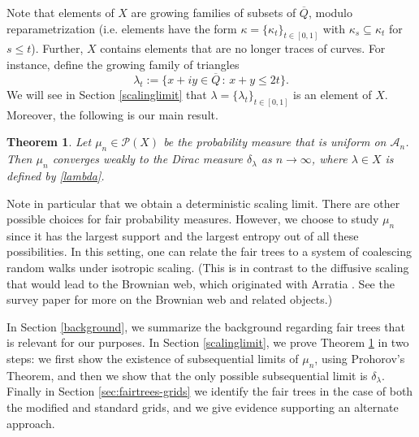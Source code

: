 \documentclass[preprint,12pt]{elsarticle}
\newtheorem{theorem}{Theorem}[section]
\theoremstyle{definition}
\theoremstyle{remark}
\numberwithin{equation}{section}
\newcommand{\cP}{\mathcal{P}}
\begin{document}
Note that elements of $X$ are growing families of subsets of $\overline{Q}$, modulo reparametrization (i.e. elements have the form $\kappa = \{\kappa_t\}_{t \in [0,1]}$ with $\kappa_s \subseteq \kappa_t$ for $s \leq t$).
Further, $X$ contains elements that are no longer traces of curves.  
For instance, 
define the growing family of triangles
\begin{equation}\label{lambda}
\lambda_t := \{ x+iy \in \overline{Q} \, : \, x+y \leq 2t \}.
\end{equation}
We will see in Section \ref{scalinglimit} that $\lambda = \{\lambda_t\}_{t\in[0,1]}$ is an element of $X$. Moreover, the following is our main result. 
\begin{theorem} \label{weakconvergence}
Let $\mu_n \in \cP(X)$ be the probability measure that is uniform on $\mathcal{A}_n$.
Then  $\mu_n$ converges weakly to the Dirac measure $\delta_\lambda$ as $n \to \infty$, where $\lambda   \in X$ is defined by \eqref{lambda}.
\end{theorem}

Note in particular that we obtain a deterministic scaling limit.  
There are other possible choices for fair probability measures.  However, we choose  to study $\mu_n$ since it has the largest support and the largest entropy out of all these possibilities.  
In this setting, one can relate the fair trees  to a system of coalescing random walks under isotropic scaling.  
(This is in contrast to the diffusive scaling that would lead to the Brownian web, which originated with Arratia \cite{arratia79}.  See the survey paper \cite{schertzer_sun_swart_2016} for more on the Brownian web and related objects.)
 

In Section \ref{background}, we summarize the background regarding fair trees that is relevant for our purposes. 
In Section \ref{scalinglimit}, we prove Theorem \ref{weakconvergence} in two steps: we first show the existence of subsequential limits of $\mu_n$, using Prohorov's Theorem, and then we show that the only possible subsequential limit is $\delta_\lambda$.
Finally in Section \ref{sec:fairtrees-grids} we identify the fair trees in the case of both the modified and standard grids, and we give  evidence supporting an alternate approach.

\end{document}
